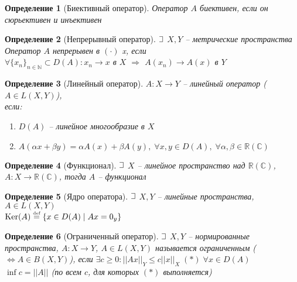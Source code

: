 \documentclass{article}
\theoremstyle{truestyle}
\newtheorem*{defenition}{Определение}
\newcommand{\Ker}{\text{Ker}}
\newcommand{\eqdef}{\overset{\text{\tiny def}}=}
\def\letus{%
	\mathord{\setbox0=\hbox{$\exists$}%
		\hbox{\kern 0.125\wd0%
			\vbox to \ht0{%
				\hrule width 0.75\wd0%
				\vfill%
				\hrule width 0.75\wd0}%
			\vrule height \ht0%
			\kern 0.125\wd0}%
	}%
}
\begin{document}
\begin{defenition}[Биективный оператор]
  Оператор $A$ биективен, если он сюрьективен и инъективен
\end{defenition}

\begin{defenition}[Непрерывный оператор]
  $\letus$ $X, Y$ -- метрические пространства\\
  Оператор $A$ непрерывен в $(\cdot)$ x, если\\
  $\forall \{x_n\}_{n \in \mathbb{N}} \subset D(A): x_n \rightarrow x$ в $X$ $\Longrightarrow$ $A(x_n) \rightarrow A(x)$ в $Y$
\end{defenition}

\begin{defenition}[Линейный оператор]
  $A: X \longrightarrow Y$ -- линейный оператор ($A \in L(X, Y)$), \\ если: 
  \begin{minipage}[t]{0.8\linewidth}\begin{enumerate}[itemsep=1mm]
    \item $D(A)$ -- линейное многообразие в $X$
    \item $A(\alpha x + \beta y) = \alpha A(x) + \beta A(y), \; 
    \forall x, y \in D(A), \; \forall \alpha, \beta \in \mathbb{R}(\mathbb{C})$
  \end{enumerate}\end{minipage}
\end{defenition}

\begin{defenition}[Функционал]
  $\letus$ $X$ -- линейное пространство над $\mathbb{R}(\mathbb{C})$, $A: X \longrightarrow \mathbb{R}(\mathbb{C})$,
  тогда $A$ -- функционал  
\end{defenition}

\begin{defenition}[Ядро оператора]
  $\letus$ $X, Y$ -- линейные пространства, $A \in L(X, Y)$\\
  $\Ker(A) \eqdef \{x \in D(A) \mid Ax = 0_y\}$
\end{defenition}

\begin{defenition}[Ограниченный оператор]
  $\letus$ $X, Y$ -- нормированные пространства, $A: X \longrightarrow Y$, $A \in L(X, Y)$ называется ограниченным ($\Leftrightarrow A\in B(X, Y)$), если
  $\exists c \ge 0: ||Ax||_Y \le c ||x||_X \; (*) \; \forall x \in D(A)$\\
  $\inf c = ||A||$ (по всем $c$, для которых $(*)$ выполняется)
\end{defenition}
  
\end{document}
